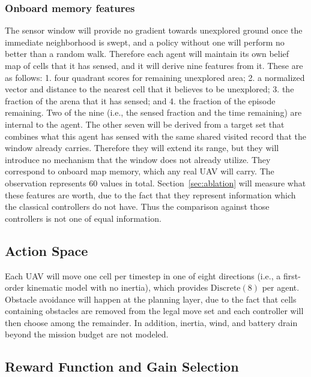 \documentclass[a4paper, 10pt, conference]{ieeeconf}
\begin{document}
\subsubsection{Onboard memory features}\label{sec:memory}

The sensor window will provide no gradient towards unexplored ground
once the immediate neighborhood is swept, and a policy without one
will perform no better than a random walk. Therefore each agent will
maintain its own belief map of cells that it has sensed, and it will
derive nine features from it. These are as follows: 1. four quadrant
scores for remaining unexplored area; 2. a normalized vector and
distance to the nearest cell that it believes to be unexplored; 3. the
fraction of the arena that it has sensed; and 4. the fraction of the
episode remaining. Two of the nine (i.e., the sensed fraction and the
time remaining) are internal to the agent. The other seven will be
derived from a target set that combines what this agent has sensed
with the same shared visited record that the window already carries.
Therefore they will extend its range, but they will introduce no
mechanism that the window does not already utilize. They correspond to
onboard map memory, which any real UAV will carry. The observation
represents 60 values in total. Section~\ref{sec:ablation} will measure
what these features are worth, due to the fact that they represent
information which the classical controllers do not have. Thus the
comparison against those controllers is not one of equal information.

\subsection{Action Space}\label{sec:action}

Each UAV will move one cell per timestep in one of eight directions
(i.e., a first-order kinematic model with no inertia), which provides
$\text{Discrete}(8)$ per agent. Obstacle avoidance will happen at the
planning layer, due to the fact that cells containing obstacles are
removed from the legal move set and each controller will then choose
among the remainder. In addition, inertia, wind, and battery drain
beyond the mission budget are not modeled.

\subsection{Reward Function and Gain Selection}\label{sec:reward}
\end{document}
